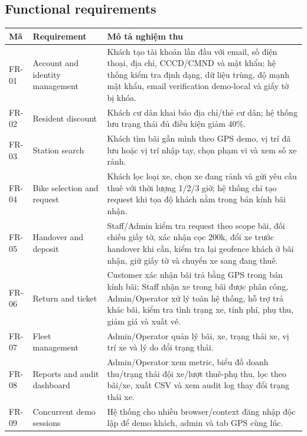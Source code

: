 \subsection{Functional requirements}
\begin{longtable}{P{0.13\textwidth}P{0.32\textwidth}P{0.45\textwidth}}
\toprule
\textbf{Mã} & \textbf{Requirement} & \textbf{Mô tả nghiệm thu} \\
\midrule
FR-01 & Account and identity management & Khách tạo tài khoản lần đầu với email, số điện thoại, địa chỉ, CCCD/CMND và mật khẩu; hệ thống kiểm tra định dạng, dữ liệu trùng, độ mạnh mật khẩu, email verification demo-local và giấy tờ bị khóa. \\
FR-02 & Resident discount & Khách cư dân khai báo địa chỉ/thẻ cư dân; hệ thống lưu trạng thái đủ điều kiện giảm 40\%. \\
FR-03 & Station search & Khách tìm bãi gần mình theo GPS demo, vị trí đã lưu hoặc vị trí nhập tay, chọn phạm vi và xem số xe rảnh. \\
FR-04 & Bike selection and request & Khách lọc loại xe, chọn xe đang rảnh và gửi yêu cầu thuê với thời lượng 1/2/3 giờ; hệ thống chỉ tạo request khi tọa độ khách nằm trong bán kính bãi nhận. \\
FR-05 & Handover and deposit & Staff/Admin kiểm tra request theo scope bãi, đối chiếu giấy tờ, xác nhận cọc 200k, đổi xe trước handover khi cần, kiểm tra lại geofence khách ở bãi nhận, giữ giấy tờ và chuyển xe sang đang thuê. \\
FR-06 & Return and ticket & Customer xác nhận bãi trả bằng GPS trong bán kính bãi; Staff nhận xe trong bãi được phân công, Admin/Operator xử lý toàn hệ thống, hỗ trợ trả khác bãi, kiểm tra tình trạng xe, tính phí, phụ thu, giảm giá và xuất vé. \\
FR-07 & Fleet management & Admin/Operator quản lý bãi, xe, trạng thái xe, vị trí xe và lý do đổi trạng thái. \\
FR-08 & Reports and audit dashboard & Admin/Operator xem metric, biểu đồ doanh thu/trạng thái đội xe/lượt thuê-phụ thu, lọc theo bãi/xe, xuất CSV và xem audit log thay đổi trạng thái xe. \\
FR-09 & Concurrent demo sessions & Hệ thống cho nhiều browser/context đăng nhập độc lập để demo khách, admin và tab GPS cùng lúc. \\
\bottomrule
\end{longtable}

